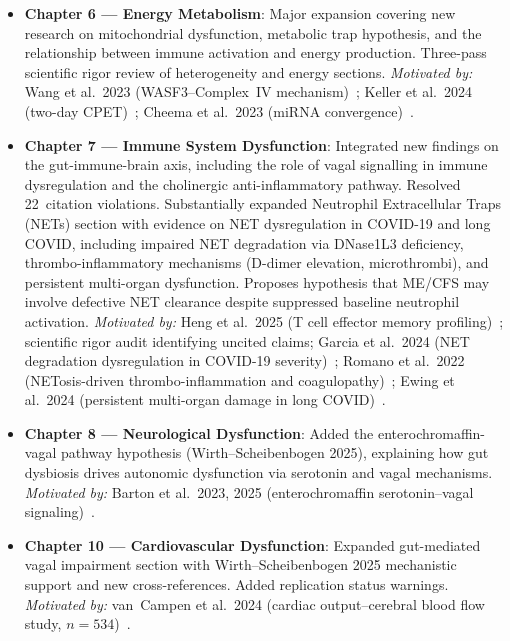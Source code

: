 \begin{itemize}

  \item \textbf{Chapter 6 --- Energy Metabolism}: Major expansion covering new
    research on mitochondrial dysfunction, metabolic trap hypothesis, and the
    relationship between immune activation and energy production. Three-pass
    scientific rigor review of heterogeneity and energy sections.
    \textit{Motivated by:} Wang et al.~2023 (WASF3--Complex~IV mechanism)~\cite{wang2023wasf3};
    Keller et al.~2024 (two-day CPET)~\cite{keller2024cpet};
    Cheema et al.~2023 (miRNA convergence)~\cite{Cheema2023mirna}.

  \item \textbf{Chapter 7 --- Immune System Dysfunction}: Integrated new findings
    on the gut-immune-brain axis, including the role of vagal signalling in
    immune dysregulation and the cholinergic anti-inflammatory pathway. Resolved
    22~citation violations. Substantially expanded Neutrophil Extracellular Traps
    (NETs) section with evidence on NET dysregulation in COVID-19 and long COVID,
    including impaired NET degradation via DNase1L3 deficiency, thrombo-inflammatory
    mechanisms (D-dimer elevation, microthrombi), and persistent multi-organ
    dysfunction. Proposes hypothesis that ME/CFS may involve defective NET
    clearance despite suppressed baseline neutrophil activation.
    \textit{Motivated by:} Heng et al.~2025 (T cell effector memory profiling)~\cite{heng2025mecfs};
    scientific rigor audit identifying uncited claims; Garcia et al.~2024 (NET
    degradation dysregulation in COVID-19 severity)~\cite{GarciaLabroucheColomer2024};
    Romano et al.~2022 (NETosis-driven thrombo-inflammation and coagulopathy)~\cite{Romano2022};
    Ewing et al.~2024 (persistent multi-organ damage in long COVID)~\cite{Ewing2024}.

  \item \textbf{Chapter 8 --- Neurological Dysfunction}: Added the
    enterochromaffin-vagal pathway hypothesis (Wirth--Scheibenbogen 2025),
    explaining how gut dysbiosis drives autonomic dysfunction via serotonin and
    vagal mechanisms.
    \textit{Motivated by:} Barton et al.~2023, 2025 (enterochromaffin serotonin--vagal
    signaling)~\cite{Barton2023,Barton2025}.

  \item \textbf{Chapter 10 --- Cardiovascular Dysfunction}: Expanded
    gut-mediated vagal impairment section with Wirth--Scheibenbogen 2025
    mechanistic support and new cross-references. Added replication status
    warnings.
    \textit{Motivated by:} van~Campen et al.~2024 (cardiac output--cerebral blood flow
    study, $n=534$)~\cite{VanCampenEtAl2024}.


\end{itemize}
